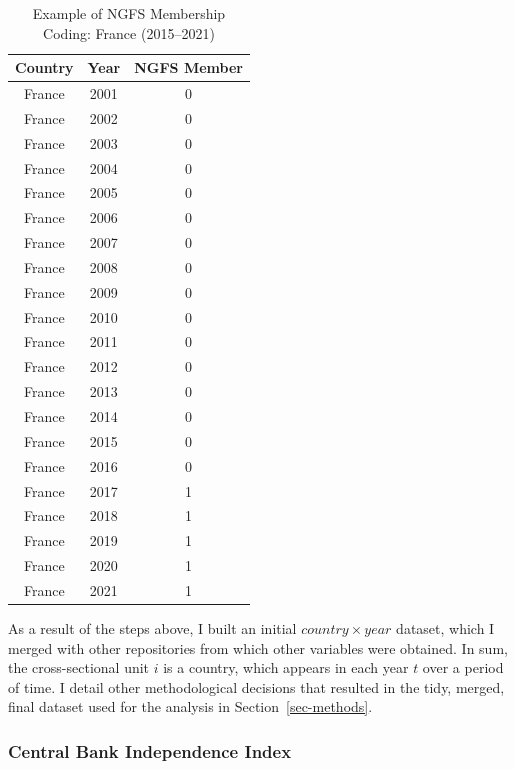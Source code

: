 \documentclass[
  12pt,
  letterpaper,
]{article}
\begin{document}
\newpage{}

\begin{longtable}[t]{ccc}

\caption{\label{tbl-france-ngfs}Example of NGFS Membership Coding:
France (2015--2021)}

\tabularnewline

\toprule
Country & Year & NGFS Member\\
\midrule
France & 2001 & 0\\
France & 2002 & 0\\
France & 2003 & 0\\
France & 2004 & 0\\
France & 2005 & 0\\
\addlinespace
France & 2006 & 0\\
France & 2007 & 0\\
France & 2008 & 0\\
France & 2009 & 0\\
France & 2010 & 0\\
\addlinespace
France & 2011 & 0\\
France & 2012 & 0\\
France & 2013 & 0\\
France & 2014 & 0\\
France & 2015 & 0\\
\addlinespace
France & 2016 & 0\\
France & 2017 & 1\\
France & 2018 & 1\\
France & 2019 & 1\\
France & 2020 & 1\\
\addlinespace
France & 2021 & 1\\
\bottomrule

\end{longtable}

As a result of the steps above, I built an initial
\(country \times year\) dataset, which I merged with other repositories
from which other variables were obtained. In sum, the cross-sectional
unit \(i\) is a country, which appears in each year \(t\) over a period
of time. I detail other methodological decisions that resulted in the
tidy, merged, final dataset used for the analysis in
Section~\ref{sec-methods}.

\subsubsection{Central Bank Independence
Index}\label{central-bank-independence-index}
\end{document}
